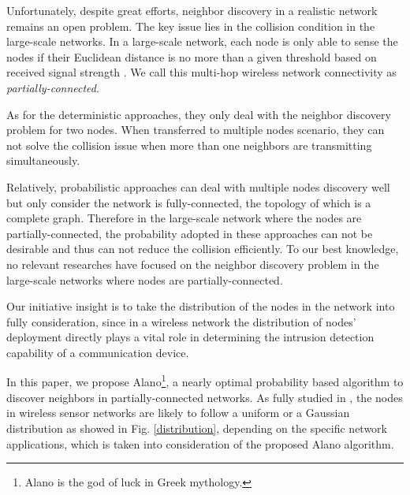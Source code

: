 Unfortunately, despite great efforts, neighbor discovery in a realistic network remains an open problem.
The key issue lies in the collision condition in the large-scale networks.
In a large-scale network, each node is only able to sense the 
nodes if their Euclidean distance is no more than a given threshold 
based on received signal strength \cite{moscibroda2006complexity, wang2013gaussian, wang2015connectivity}.  
We call this multi-hop wireless network connectivity as \emph{partially-connected}.


As for the deterministic approaches, they only deal with the neighbor discovery problem for two nodes.
When transferred to multiple nodes scenario, they can not solve the collision issue when more 
than one neighbors are transmitting simultaneously. 


Relatively, probabilistic approaches can deal with multiple nodes discovery well but only consider
the network is fully-connected, the topology of which is a complete graph. 
Therefore in the large-scale network where the nodes are partially-connected,  
the probability adopted in these approaches can not be desirable 
and thus can not reduce the collision efficiently. 
To our best knowledge, no relevant researches 
have focused on the neighbor discovery problem in the large-scale networks 
where nodes are partially-connected.


Our initiative insight is to take the distribution of the nodes in the network
into fully consideration, since in a wireless network the distribution of 
nodes' deployment directly plays a vital role in determining the intrusion 
detection capability of a communication device.

In this paper, we propose Alano\footnote{Alano is the god of luck in Greek mythology.}, 
a nearly optimal probability based algorithm to discover neighbors in partially-connected networks. 
As fully studied in \cite{wang2013gaussian} , the nodes in wireless sensor networks are likely to 
follow a uniform or a Gaussian distribution as showed in Fig. \ref{distribution}, 
depending on the specific network applications, which is taken into consideration of the proposed Alano algorithm.

